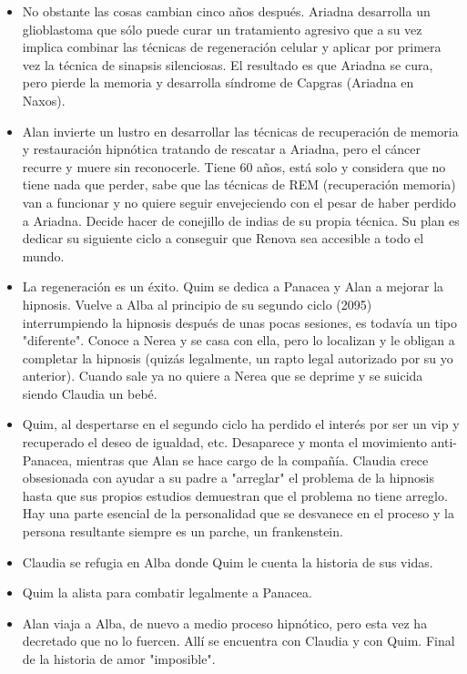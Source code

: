 \begin{itemize}
\item No obstante las cosas cambian cinco años después. Ariadna desarrolla un glioblastoma que sólo puede curar un tratamiento agresivo que a su vez implica combinar las técnicas de regeneración celular y aplicar por primera vez la técnica de sinapsis silenciosas. El resultado es que Ariadna se cura, pero pierde la memoria y desarrolla síndrome de Capgras (Ariadna en Naxos). 
\item Alan invierte un lustro en desarrollar las técnicas de recuperación de memoria y restauración hipnótica tratando de rescatar a Ariadna, pero el cáncer recurre y muere sin reconocerle. Tiene 60 años, está solo y considera que no tiene nada que perder, sabe que las técnicas de REM (recuperación memoria) van a funcionar y no quiere seguir envejeciendo con el pesar de haber perdido a Ariadna. Decide hacer de conejillo de indias de su propia técnica. Su plan es dedicar su siguiente ciclo a conseguir que Renova sea accesible a todo el mundo.  
\item La regeneración es un éxito. Quim se dedica a Panacea y Alan a mejorar la hipnosis. Vuelve a Alba al principio de su segundo ciclo (2095) interrumpiendo la hipnosis después de unas pocas sesiones, es todavía un tipo "diferente". Conoce a Nerea y se casa con ella, pero lo localizan y le obligan a completar la hipnosis (quizás legalmente, un rapto legal autorizado por su yo anterior). Cuando sale ya no quiere a Nerea que se deprime y se suicida siendo Claudia un bebé. 
\item Quim, al despertarse en el segundo ciclo ha perdido el interés por ser un vip y recuperado el deseo de igualdad, etc. Desaparece y monta el movimiento anti-Panacea, mientras que Alan se hace cargo de la compañía. Claudia crece obsesionada con ayudar a su padre a "arreglar" el problema de la hipnosis hasta que sus propios estudios demuestran que el problema no tiene arreglo. Hay una parte esencial de la personalidad que se desvanece en el proceso y la persona resultante siempre es un parche, un frankenstein. 
\item Claudia se refugia en Alba donde Quim le cuenta la historia de sus vidas. 
\item Quim la alista para combatir legalmente a Panacea. 
\item Alan viaja a Alba, de nuevo a medio proceso hipnótico, pero esta vez ha decretado que no lo fuercen. Allí se encuentra con Claudia y con Quim. Final de la historia de amor "imposible". 
\end{itemize}
